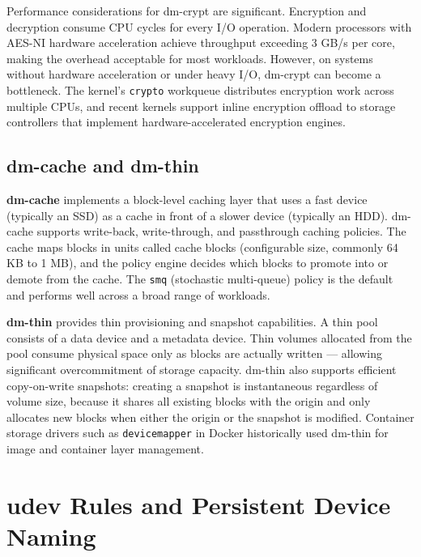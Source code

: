 Performance considerations for dm-crypt are significant. Encryption and decryption consume CPU cycles for every I/O operation. Modern processors with AES-NI hardware acceleration achieve throughput exceeding 3 GB/s per core, making the overhead acceptable for most workloads. However, on systems without hardware acceleration or under heavy I/O, dm-crypt can become a bottleneck. The kernel's \texttt{crypto} workqueue distributes encryption work across multiple CPUs, and recent kernels support inline encryption offload to storage controllers that implement hardware-accelerated encryption engines.

\subsection{dm-cache and dm-thin}

\textbf{dm-cache} implements a block-level caching layer that uses a fast device (typically an SSD) as a cache in front of a slower device (typically an HDD). dm-cache supports write-back, write-through, and passthrough caching policies. The cache maps blocks in units called cache blocks (configurable size, commonly 64 KB to 1 MB), and the policy engine decides which blocks to promote into or demote from the cache. The \texttt{smq} (stochastic multi-queue) policy is the default and performs well across a broad range of workloads.

\textbf{dm-thin} provides thin provisioning and snapshot capabilities. A thin pool consists of a data device and a metadata device. Thin volumes allocated from the pool consume physical space only as blocks are actually written --- allowing significant overcommitment of storage capacity. dm-thin also supports efficient copy-on-write snapshots: creating a snapshot is instantaneous regardless of volume size, because it shares all existing blocks with the origin and only allocates new blocks when either the origin or the snapshot is modified. Container storage drivers such as \texttt{devicemapper} in Docker historically used dm-thin for image and container layer management.

\section{udev Rules and Persistent Device Naming}
\label{sec:udev}


